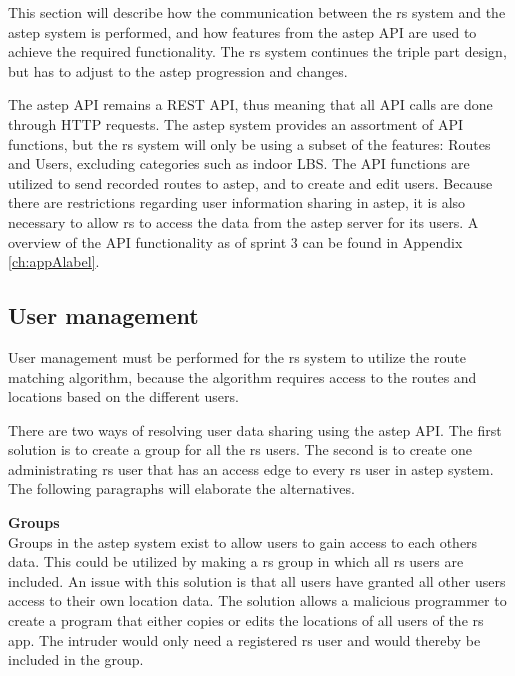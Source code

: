 \label{sec:aSTEPCommunication.tex}
This section will describe how the communication between the \gls{rs} system and the \gls{astep} system is performed, and how features from the \gls{astep} API are used to achieve the required functionality.
The \gls{rs} system continues the triple part design, but has to adjust to the \gls{astep} progression and changes.

The \gls{astep} API remains a REST API, thus meaning that all API calls are done through HTTP requests.
The \gls{astep} system provides an assortment of API functions, but the \gls{rs} system will only be using a subset of the features: Routes and Users, excluding categories such as indoor LBS.
The API functions are utilized to send recorded routes to \gls{astep}, and to create and edit users.
Because there are restrictions regarding user information sharing in \gls{astep}, it is also necessary to allow \gls{rs} to access the data from the \gls{astep} server for its users.
A overview of the API functionality as of sprint 3 can be found in Appendix \ref{ch:appAlabel}. 

\subsection{User management}\label{subsec:usermanagement}
User management must be performed for the \gls{rs} system to utilize the route matching algorithm, because the algorithm requires access to the routes and locations based on the different users.

There are two ways of resolving user data sharing using the \gls{astep} API.
The first solution is to create a group for all the \gls{rs} users.
The second is to create one administrating \gls{rs} user that has an access edge to every \gls{rs} user in \gls{astep} system.
The following paragraphs will elaborate the alternatives.

\textbf{Groups}\\ 
Groups in the \gls{astep} system exist to allow users to gain access to each others data.
This could be utilized by making a \gls{rs} group in which all \gls{rs} users are included.
An issue with this solution is that all users have granted all other users access to their own location data. 
The solution allows a malicious programmer to create a program that either copies or edits the locations of all users of the \gls{rs} app.
The intruder would only need a registered \gls{rs} user and would thereby be included in the group.

